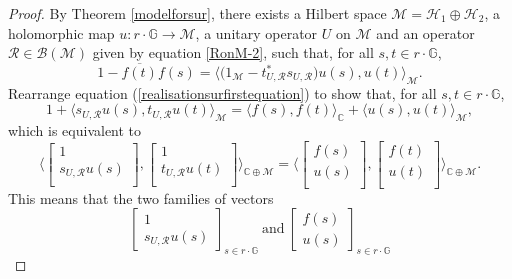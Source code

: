 \documentclass[12pt,reqno]{amsart}
\numberwithin{equation}{section}
\theoremstyle{definition}
\begin{document}
\begin{proof}
By Theorem \ref{modelforsur}, there exists a Hilbert space $\mathcal{M}=\mathcal{H}_{1}\oplus \mathcal{H}_{2}$, a holomorphic map $u: r\cdot \mathbb{G} \rightarrow \mathcal{M}$, a unitary operator $U$ on $\mathcal{M}$ and an operator $\mathcal{R}\in\mathcal{B}(\mathcal{M})$ given by equation \eqref{RonM-2},
 such that, for all $s,t \in r\cdot\mathbb{G}$, 
\begin{equation}\label{realisationsurfirstequation}
1- \overline{f(t)}f(s) =\Bigg\langle  \bigg(1_{\mathcal{M}}-t_{U,\mathcal{R}}^{*}s_{U,\mathcal{R}}\bigg)u(s),u(t)\Bigg\rangle_{\mathcal{M}}.
\end{equation}
Rearrange equation (\ref{realisationsurfirstequation}) to show that, for all $s,t \in r\cdot\mathbb{G}$, 
$$ 1+ \langle s_{U,\mathcal{R}} u(s),t_{U,\mathcal{R}}u(t)\rangle_{\mathcal{M}} = \langle f(s), f(t) \rangle_{\mathbb{C}}+ \langle u(s), u(t) \rangle_{\mathcal{M}}, $$
which is equivalent to
\begin{equation} 
\Bigg\langle \begin{bmatrix}
	1 \\
	s_{U,\mathcal{R}}u(s)\\
\end{bmatrix}, 
\begin{bmatrix}
	1 \\
	t_{U,\mathcal{R}}u(t)\\
\end{bmatrix}
\Bigg\rangle_{\mathbb{C}\oplus\mathcal{M}} = 
\Bigg\langle\begin{bmatrix}
	f(s) \\
	u(s)\\
\end{bmatrix}, 
\begin{bmatrix}
	f(t) \\
	u(t)\\
\end{bmatrix}
\Bigg\rangle_{\mathbb{C}\oplus\mathcal{M}}.
\end{equation}
This means that the two families of vectors 
\begin{equation*}
	\begin{bmatrix}
	1 \\
	s_{U,\mathcal{R}}u(s) 
	\end{bmatrix}_{s\in r\cdot\mathbb{G}}~\text{and}~
	\begin{bmatrix}
	f(s) \\
	u(s)
	\end{bmatrix}_{s\in r\cdot\mathbb{G}}
\end{equation*}

\end{proof}
\end{document}

